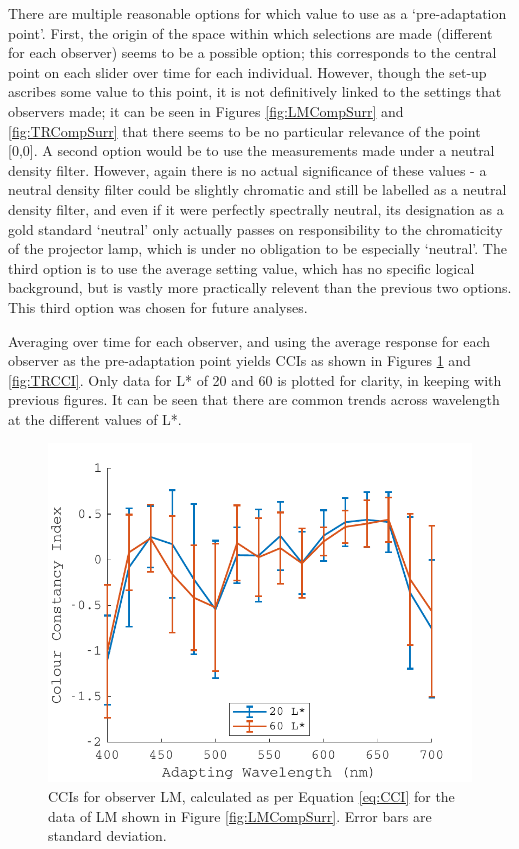 There are multiple reasonable options for which value to use as a `pre-adaptation point'. First, the origin of the space within which selections are made (different for each observer) seems to be a possible option; this corresponds to the central point on each slider over time for each individual. However, though the set-up ascribes some value to this point, it is not definitively linked to the settings that observers made; it can be seen in Figures \ref{fig:LMCompSurr} and \ref{fig:TRCompSurr} that there seems to be no particular relevance of the point [0,0]. A second option would be to use the measurements made under a neutral density filter. However, again there is no actual significance of these values - a neutral density filter could be slightly chromatic and still be labelled as a neutral density filter, and even if it were perfectly spectrally neutral, its designation as a gold standard `neutral' only actually passes on responsibility to the chromaticity of the projector lamp, which is under no obligation to be especially `neutral'. The third option is to use the average setting value, which has no specific logical background, but is vastly more practically relevent than the previous two options. This third option was chosen for future analyses.

Averaging over time for each observer, and using the average response for each observer as the pre-adaptation point yields \glspl{CCI} as shown in Figures \ref{fig:LMCCI} and \ref{fig:TRCCI}. Only data for L* of 20 and 60 is plotted for clarity, in keeping with previous figures. It can be seen that there are common trends across wavelength at the different values of L*.

\begin{figure}[htbp]
\includegraphics[max width=\textwidth]{figs/LargeSphere/LMCCI.pdf}
\caption{\Glspl{CCI} for observer LM, calculated as per Equation \ref{eq:CCI} for the data of LM shown in Figure \ref{fig:LMCompSurr}. Error bars are standard deviation.}
\label{fig:LMCCI}
\end{figure}

